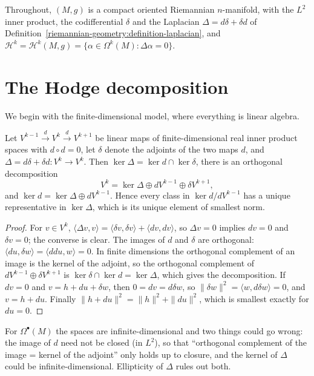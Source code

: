 Throughout, $(M, g)$ is a compact oriented Riemannian $n$-manifold, with the $L^2$ inner product, the codifferential $\delta$ and the
Laplacian $\Delta = d\delta + \delta d$ of Definition~\ref{riemannian-geometry:definition-laplacian}, and
$\mathcal{H}^k = \mathcal{H}^k(M, g) = \{\alpha \in \Omega^k(M) : \Delta\alpha = 0\}$.

\section{The Hodge decomposition}\label{hodge-theorem:section-decomposition}

We begin with the finite-dimensional model, where everything is linear algebra.

\begin{lemma}\label{hodge-theorem:lemma-finite-dimensional}
Let $V^{k-1} \xrightarrow{d} V^k \xrightarrow{d} V^{k+1}$ be linear maps of finite-dimensional real inner product spaces with $d \circ d = 0$, let $\delta$ denote the adjoints of the two maps $d$, and
$\Delta = d\delta + \delta d \colon V^k \to V^k$. Then $\ker\Delta = \ker d \cap \ker\delta$, there is an orthogonal decomposition
\[
V^k = \ker\Delta \oplus dV^{k-1} \oplus \delta V^{k+1},
\]
and $\ker d = \ker\Delta \oplus dV^{k-1}$. Hence every class in $\ker d/dV^{k-1}$ has a unique representative in $\ker\Delta$, which is its unique element of smallest norm.
\end{lemma}

\begin{proof}
For $v \in V^k$, $\langle\Delta v, v\rangle = \langle\delta v, \delta v\rangle + \langle dv, dv\rangle$, so $\Delta v = 0$ implies $dv = 0$ and $\delta v = 0$; the converse is clear. The images of $d$ and $\delta$ are
orthogonal: $\langle du, \delta w\rangle = \langle ddu, w\rangle = 0$. In finite dimensions the orthogonal complement of an image is the kernel of the adjoint, so the orthogonal complement of
$dV^{k-1} \oplus \delta V^{k+1}$ is $\ker\delta \cap \ker d = \ker\Delta$, which gives the decomposition. If $dv = 0$ and $v = h + du + \delta w$, then $0 = dv = d\delta w$, so
$\|\delta w\|^2 = \langle w, d\delta w\rangle = 0$, and $v = h + du$. Finally $\|h + du\|^2 = \|h\|^2 + \|du\|^2$, which is smallest exactly for $du = 0$.
\end{proof}

For $\Omega^\bullet(M)$ the spaces are infinite-dimensional and two things could go wrong: the image of $d$ need not be closed (in $L^2$), so that ``orthogonal complement of the image = kernel of the
adjoint'' only holds up to closure, and the kernel of $\Delta$ could be infinite-dimensional. Ellipticity of $\Delta$ rules out both.


